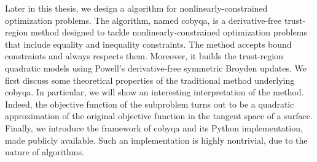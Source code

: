 Later in this thesis, we design a  algorithm for nonlinearly-constrained optimization problems.
The algorithm, named \gls{cobyqa}, is a derivative-free trust-region  method designed to tackle nonlinearly-constrained optimization problems that include equality and inequality constraints.
The method accepts bound constraints and always respects them.
Moreover, it builds the trust-region quadratic models using Powell's derivative-free symmetric Broyden updates.
We first discuss some theoretical properties of the traditional  method underlying \gls{cobyqa}.
In particular, we will show an interesting interpretation of the  method.
Indeed, the objective function of the  subproblem turns out to be a quadratic approximation of the original objective function in the tangent space of a surface.
Finally, we introduce the framework of \gls{cobyqa} and its Python implementation, made publicly available.
Such an implementation is highly nontrivial, due to the nature of  algorithms.
